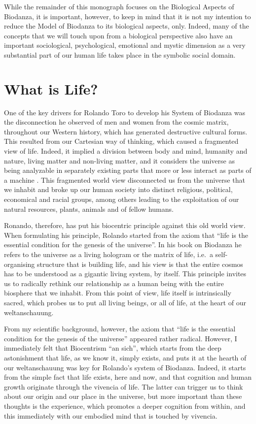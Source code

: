 \documentclass[
  11pt,
]{book}
\begin{document}
While the remainder of this monograph focuses on the Biological Aspects of Biodanza, it is important, however, to keep in mind that it is not my intention to reduce the Model of Biodanza to its biological aspects, only. Indeed, many of the concepts that we will touch upon from a biological perspective also have an important sociological, psychological, emotional and mystic dimension as a very substantial part of our human life takes place in the symbolic social domain.

\hypertarget{what-is-life}{%
\chapter{What is Life?}\label{what-is-life}}

One of the key drivers for Rolando Toro to develop his System of Biodanza was the disconnection he observed of men and women from the cosmic matrix, throughout our Western history, which has generated destructive cultural forms. This resulted from our Cartesian way of thinking, which caused a fragmented view of life. Indeed, it implied a division between body and mind, humanity and nature, living matter and non-living matter, and it considers the universe as being analyzable in separately existing parts that more or less interact as parts of a machine \citep{bohm1980}. This fragmented world view disconnected us from the universe that we inhabit and broke up our human society into distinct religious, political, economical and racial groups, among others leading to the exploitation of our natural resources, plants, animals and of fellow humans.

Ronando, therefore, has put his biocentric principle against this old world view. When formulating his principle, Rolando started from the axiom that ``life is the essential condition for the genesis of the universe''. In his book on Biodanza \citep{toro2008} he refers to the universe as a living hologram or the matrix of life, i.e.~a self-organising structure that is building life, and his view is that the entire cosmos has to be understood as a gigantic living system, by itself. This principle invites us to radically rethink our relationship as a human being with the entire biosphere that we inhabit. From this point of view, life itself is intrinsically sacred, which probes us to put all living beings, or all of life, at the heart of our weltanschauung.

From my scientific background, however, the axiom that ``life is the essential condition for the genesis of the universe'' appeared rather radical. However, I immediately felt that Biocentrism ``an sich'', which starts from the deep astonishment that life, as we know it, simply exists, and puts it at the hearth of our weltanschauung was key for Rolando's system of Biodanza. Indeed, it starts from the simple fact that life exists, here and now, and that cognition and human growth originate through the vivencia of life. The latter can trigger us to think about our origin and our place in the universe, but more important than these thoughts is the experience, which promotes a deeper cognition from within, and this immediately with our embodied mind that is touched by vivencia.
\end{document}
